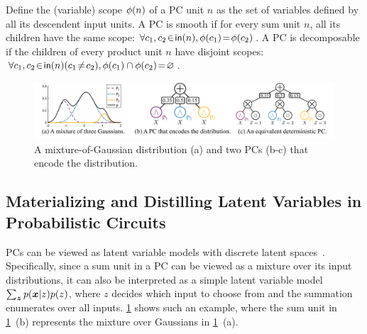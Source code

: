 \documentclass{article} %
\begin{document}
\begin{defn}
\label{def:sm-dec}
Define the (variable) scope ${\phi}(n)$ of a PC unit $n$ as the set of variables defined by all its descendent input units. A PC is smooth if for every sum unit $n$, all its children have the same scope: $\forall c_{1}, c_{2} \!\in\! \mathsf{in}(n), {\phi}(c_{1}) \!=\! {\phi}(c_{2})$. A PC is decomposable if the children of every product unit $n$ have disjoint scopes: $\forall c_{1}, c_{2} \!\in\! \mathsf{in}(n) (c_{1} \!\neq\! c_{2}), {\phi}(c_{1}) \cap {\phi}(c_{2}) \!=\! \varnothing$.
\end{defn}

\begin{figure}
    \centering
    \includegraphics[width=\columnwidth]{figures/fig-mixture-of-gaussian.pdf}
    \vspace{-1.8em}
    \caption{A mixture-of-Gaussian distribution (a) and two PCs (b-c) that encode the distribution.}
    \label{fig:mixture-of-gaussian}
    \vspace{-1em}
\end{figure}

\subsection{Materializing and Distilling Latent Variables in Probabilistic Circuits}
\label{sec:lv-distillation}



PCs can be viewed as latent variable models with discrete latent spaces~\citep{peharz2016latent}. Specifically, since a sum unit in a PC can be viewed as a mixture over its input distributions, it can also be interpreted as a simple latent variable model $\sum_{\boldsymbol{z}} {p}(\boldsymbol{x} \vert z) {p}(z)$, where $z$ decides which input to choose from and the summation enumerates over all inputs. \cref{fig:mixture-of-gaussian} shows such an example, where the sum unit in \cref{fig:mixture-of-gaussian}~(b) represents the mixture over Gaussians in \cref{fig:mixture-of-gaussian}~(a). 
\end{document}
